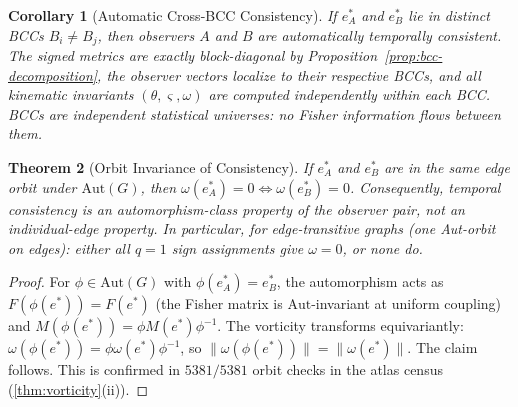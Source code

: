 \documentclass[11pt]{article}
\newtheorem{theorem}{Theorem}[section]
\newtheorem{corollary}[theorem]{Corollary}
\theoremstyle{definition}
\theoremstyle{remark}
\newcommand{\Fish}{F}
\newcommand{\Met}{M}
\newcommand{\vort}{\omega}
\newcommand{\expan}{\theta}
\newcommand{\shear}{\varsigma} %
\begin{document}
\begin{corollary}[Automatic Cross-BCC Consistency]
\label{cor:cross-bcc-consistency}
If $e^*_A$ and $e^*_B$ lie in distinct BCCs $B_i \neq B_j$, then observers
$A$ and $B$ are automatically temporally consistent.  The signed metrics
are exactly block-diagonal by Proposition~\ref{prop:bcc-decomposition},
the observer vectors localize to their respective BCCs, and all kinematic
invariants $(\expan, \shear, \vort)$ are computed independently within
each BCC.  BCCs are \emph{independent statistical universes}: no Fisher
information flows between them.
\end{corollary}

\begin{theorem}[Orbit Invariance of Consistency]
\label{thm:orbit-consistency}
If $e^*_A$ and $e^*_B$ are in the same edge orbit under
$\mathrm{Aut}(G)$, then $\vort(e^*_A) = 0 \Leftrightarrow \vort(e^*_B) = 0$.
Consequently, temporal consistency is an automorphism-class property of
the observer pair, not an individual-edge property.
In particular, for edge-transitive graphs (one Aut-orbit on edges):
either \emph{all} $q = 1$ sign assignments give $\vort = 0$, or
\emph{none} do.
\end{theorem}

\begin{proof}
For $\phi \in \mathrm{Aut}(G)$ with $\phi(e^*_A) = e^*_B$, the automorphism
acts as $\Fish(\phi(e^*)) = \Fish(e^*)$ (the Fisher matrix is
$\mathrm{Aut}$-invariant at uniform coupling) and
$\Met(\phi(e^*)) = \phi \Met(e^*) \phi^{-1}$.  The vorticity transforms
equivariantly: $\vort(\phi(e^*)) = \phi \vort(e^*) \phi^{-1}$, so
$\|\vort(\phi(e^*))\| = \|\vort(e^*)\|$.  The claim follows.
This is confirmed in $5381/5381$ orbit checks in the atlas census
(\cref{thm:vorticity}(ii)).
\end{proof}
\end{document}
